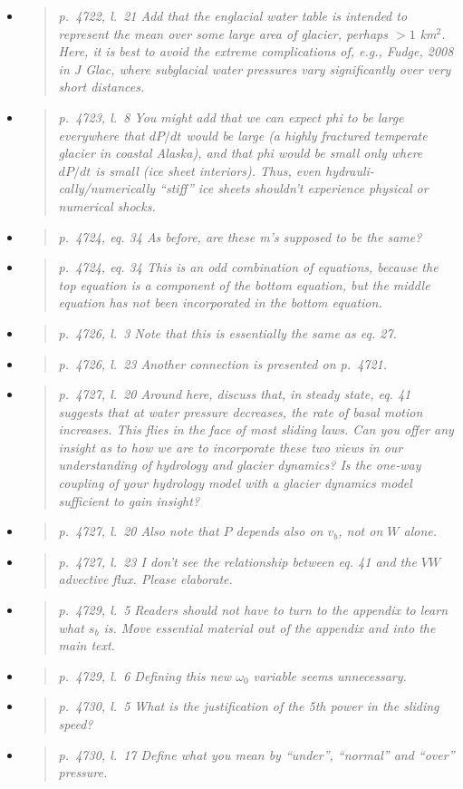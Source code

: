 \documentclass[11pt,reqno]{amsart}
\newcommand{\reply}[2]{
\medskip\medskip
\item  \begin{quote}
\emph{#1}
\end{quote}

\medskip
\noindent #2}
\begin{document}
\begin{itemize}
\reply{p.~4722, l.~21 Add that the englacial water table is intended to represent the mean
over some large area of glacier, perhaps $>1$ km$^2$. Here, it is best to avoid the extreme
complications of, e.g., Fudge, 2008 in J Glac, where subglacial water pressures vary
significantly over very short distances.}
{}

\reply{p.~4723, l.~8 You might add that we can expect phi to be large everywhere that $dP/dt$
would be large (a highly fractured temperate glacier in coastal Alaska), and that phi
would be small only where $dP/dt$ is small (ice sheet interiors). Thus, even hydrauli-
cally/numerically ``stiff'' ice sheets shouldn’t experience physical or numerical shocks.}
{}

\reply{p.~4724, eq. 34 As before, are these m's supposed to be the same?}
{}

\reply{p.~4724, eq. 34 This is an odd combination of equations, because the top equation is a
component of the bottom equation, but the middle equation has not been incorporated
in the bottom equation.}
{}

\reply{p.~4726, l.~3 Note that this is essentially the same as eq. 27.}
{}

\reply{p.~4726, l.~23 Another connection is presented on p.~4721.}
{}

\reply{p.~4727, l.~20 Around here, discuss that, in steady state, eq. 41 suggests that at water
pressure decreases, the rate of basal motion increases. This flies in the face of most
sliding laws. Can you offer any insight as to how we are to incorporate these two views
in our understanding of hydrology and glacier dynamics? Is the one-way coupling of
your hydrology model with a glacier dynamics model sufficient to gain insight?}
{}

\reply{p.~4727, l.~20 Also note that $P$ depends also on $v_b$, not on $W$ alone.}
{}

\reply{p.~4727, l.~23 I don’t see the relationship between eq. 41 and the $VW$ advective flux.
Please elaborate.}
{}

\reply{p.~4729, l.~5 Readers should not have to turn to the appendix to learn what $s_b$ is.
Move essential material out of the appendix and into the main text.}
{}

\reply{p.~4729, l.~6 Defining this new $\omega_0$ variable seems unnecessary.}
{}

\reply{p.~4730, l.~5 What is the justification of the 5th power in the sliding speed?}
{}

\reply{p.~4730, l.~17 Define what you mean by ``under'', ``normal'' and ``over'' pressure.}
{}


\end{itemize}
\end{document}
